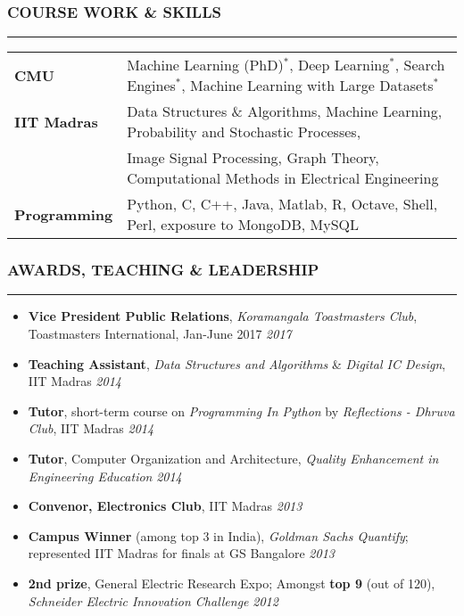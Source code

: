 \documentclass[10pt,a4paper,English]{article}
\newcommand\roottitle[1]{\vspace{-4mm}\subsubsection*{\uppercase{#1}}\vspace{-0.3em}\nopagebreak[4]\hrule\vspace{4mm}}
\newcommand\itemyear[1]{\hfill \emph{\color{itemyear} #1}}
\newcommand\itemenv{\setlength\itemsep{0.5pt} \addtolength{\itemindent}{-5mm}\vspace{-1.5mm}}
\begin{document}
\roottitle{Course Work \& Skills}
\vspace{-2mm}
\renewcommand{\arraystretch}{1.2}
\setlength\tabcolsep{0pt}
\begin{tabularx}{\textwidth}{ l @{ - } X }
\textbf{CMU}                        & Machine Learning (PhD)$^*$, Deep Learning$^*$, Search Engines$^*$, Machine Learning with Large Datasets$^*$ \\
\textbf{IIT Madras}                 & Data Structures \& Algorithms, Machine Learning, Probability and Stochastic Processes, \\
                                    & Image Signal Processing, Graph Theory, Computational Methods in Electrical Engineering \\
\textbf{Programming}                & Python, C, C++, Java, Matlab, R, Octave, Shell, Perl, exposure to MongoDB, MySQL
\end{tabularx}
\vspace{2mm}

\roottitle{Awards, Teaching \& Leadership}
\begin{itemize} \itemenv
    \item \textbf{Vice President Public Relations}, \textit{Koramangala Toastmasters Club}, Toastmasters International, Jan-June 2017 \itemyear{2017}
    \item \textbf{Teaching Assistant}, \textit{Data Structures and Algorithms} \& \textit{Digital IC Design}, IIT Madras \itemyear{2014}
    \item \textbf{Tutor}, short-term course on \textit{Programming In Python} by \emph{Reflections - Dhruva Club}, IIT Madras \itemyear{2014}
    \item \textbf{Tutor}, Computer Organization and Architecture, \emph{Quality Enhancement in Engineering Education} \itemyear{2014}
    \item \textbf{Convenor, Electronics Club}, IIT Madras \itemyear{2013}
    \item \textbf{Campus Winner} (among top {3} in India), \textit{Goldman Sachs Quantify}; represented IIT Madras for finals at GS Bangalore \itemyear{2013}
    \item \textbf{2nd prize}, General Electric Research Expo; Amongst \textbf{top 9} (out of 120), \textit{Schneider Electric Innovation Challenge} \itemyear{2012}
\end{itemize}
\vspace{1mm}

\noindent {}
\end{document}
